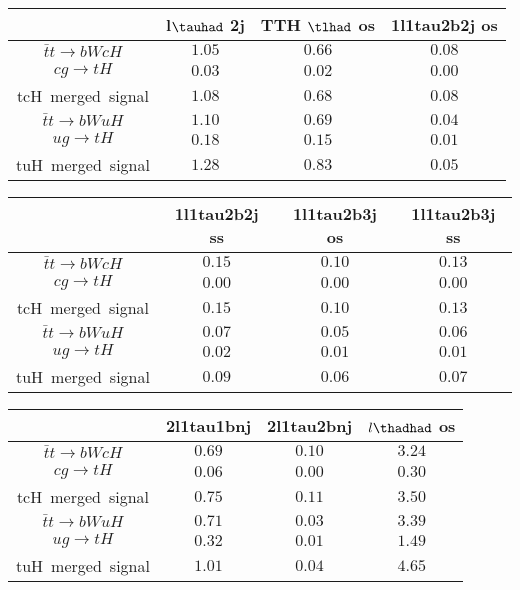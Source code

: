 \begin{tabular}{|c|c|c|c|} \hline
 & l$\tauhad$ 2j   & TTH $\tlhad$ os   & 1l1tau2b2j os  \\\hline
$\bar{t}t\to bWcH$ & $1.05$ & $0.66$ & $0.08$\\\hline
$cg\to tH$ & $0.03$ & $0.02$ & $0.00$\\\hline
tcH~merged~signal & $1.08$ & $0.68$ & $0.08$\\\hline
$\bar{t}t\to bWuH$ & $1.10$ & $0.69$ & $0.04$\\\hline
$ug\to tH$ & $0.18$ & $0.15$ & $0.01$\\\hline
tuH~merged~signal & $1.28$ & $0.83$ & $0.05$\\\hline
\end{tabular}
\begin{tabular}{|c|c|c|c|} \hline
 & 1l1tau2b2j ss   & 1l1tau2b3j os   & 1l1tau2b3j ss  \\\hline
$\bar{t}t\to bWcH$ & $0.15$ & $0.10$ & $0.13$\\\hline
$cg\to tH$ & $0.00$ & $0.00$ & $0.00$\\\hline
tcH~merged~signal & $0.15$ & $0.10$ & $0.13$\\\hline
$\bar{t}t\to bWuH$ & $0.07$ & $0.05$ & $0.06$\\\hline
$ug\to tH$ & $0.02$ & $0.01$ & $0.01$\\\hline
tuH~merged~signal & $0.09$ & $0.06$ & $0.07$\\\hline
\end{tabular}
\begin{tabular}{|c|c|c|c|} \hline
 & 2l1tau1bnj   & 2l1tau2bnj   & $l\thadhad$ os\\\hline
$\bar{t}t\to bWcH$ & $0.69$ & $0.10$ & $3.24$\\\hline
$cg\to tH$ & $0.06$ & $0.00$ & $0.30$\\\hline
tcH~merged~signal & $0.75$ & $0.11$ & $3.50$\\\hline
$\bar{t}t\to bWuH$ & $0.71$ & $0.03$ & $3.39$\\\hline
$ug\to tH$ & $0.32$ & $0.01$ & $1.49$\\\hline
tuH~merged~signal & $1.01$ & $0.04$ & $4.65$\\\hline
\end{tabular}

